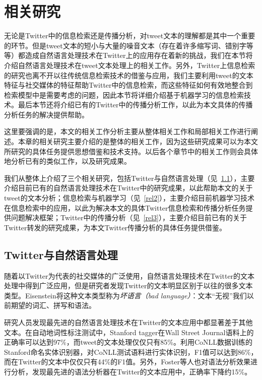 \section{相关研究}
无论是Twitter中的信息检索还是传播分析，对tweet文本的理解都是其中一个重要的环节。但是tweet文本的短小与大量的噪音文本（存在着许多缩写词、错别字等等）都造成自然语言处理技术在Twitter上的应用存在着新的挑战，我们在本节将介绍自然语言处理技术在tweet文本处理上的相关工作。另外，Twitter上信息检索的研究也离不开以往传统信息检索技术的借鉴与应用，我们主要利用tweet的文本特征与社交媒体的特征帮助Twitter中的信息检索，而这些特征如何有效地整合到检索模型中是需要考虑的问题，因此本节将详细介绍基于机器学习的信息检索技术。最后本节还将介绍已有的Twitter中的传播分析工作，以此为本文具体的传播分析任务的解决提供帮助。

这里要强调的是，本文的相关工作分析主要从整体相关工作和局部相关工作进行阐述。本章的相关研究主要介绍的是整体的相关工作，因为这些研究成果可以为本文所研究的具体任务提供思想借鉴和技术支持。以后各个章节中的相关工作则会具体地分析已有的类似工作，以及研究成果。

我们从整体上介绍了三个相关研究，包括Twitter与自然语言处理（见~\ref{rel1}），主要介绍目前已有的自然语言处理技术在Twitter中的研究成果，以此帮助本文的关于tweet的文本分析；信息检索与机器学习（见~\ref{rel2}），主要介绍目前机器学习技术在信息检索中的应用，以此为解决本文的具体Twitter信息检索和传播分析任务提供问题解决框架；Twitter中的传播分析（见~\ref{rel3}），主要介绍目前已有的关于Twitter转发的研究成果，为本文Twitter传播分析的具体任务提供借鉴。

\subsection{Twitter与自然语言处理}
\label{rel1}
随着以Twitter为代表的社交媒体的广泛使用，自然语言处理技术在Twitter的文本处理中得到广泛应用，但是研究者发现Twitter的文本明显区别于以往的很多文本类型。Eisenstein将这种文本类型称为\emph{坏语言（bad language）}：文本“无视”我们以前期望的词汇、拼写和语法。

研究人员发现最先进的自然语言处理技术在Twitter的文本应用中都显著差于其他文本。在自动地词性标注测试中，Stanford tagger在Wall Street Journal语料上的正确率可以达到97\%，而tweet的文本处理仅仅只有85\%。利用CoNLL数据训练的Stanford命名实体识别器，对CoNLL测试语料进行实体识别，F1值可以达到86\%，而在Twitter的文本中仅仅只有44\%的F1值。另外，Foster等人也对语法分析效果进行分析，发现最先进的语法分析器在Twitter的文本应用中，正确率下降约15\%。

